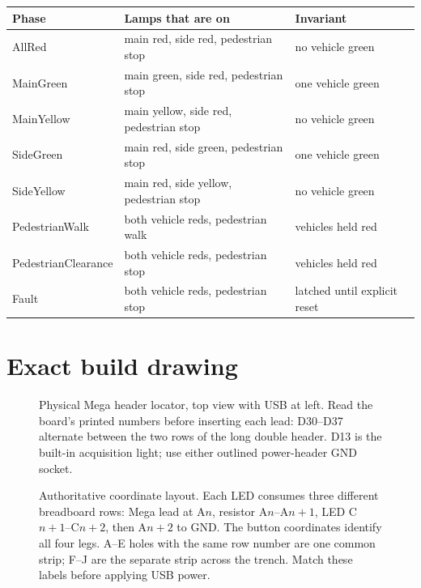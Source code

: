 \documentclass[11pt]{article}
\begin{document}
\begin{tabularx}{\linewidth}{@{}l X X@{}}
\toprule
Phase & Lamps that are on & Invariant\\
\midrule
AllRed & main red, side red, pedestrian stop & no vehicle green\\
MainGreen & main green, side red, pedestrian stop & one vehicle green\\
MainYellow & main yellow, side red, pedestrian stop & no vehicle green\\
SideGreen & main red, side green, pedestrian stop & one vehicle green\\
SideYellow & main red, side yellow, pedestrian stop & no vehicle green\\
PedestrianWalk & both vehicle reds, pedestrian walk & vehicles held red\\
PedestrianClearance & both vehicle reds, pedestrian stop & vehicles held red\\
Fault & both vehicle reds, pedestrian stop & latched until explicit reset\\
\bottomrule
\end{tabularx}

\section{Exact build drawing}

\begin{figure}[ht]
  \centering
  \resizebox{\linewidth}{!}{}
  \caption{Physical Mega header locator, top view with USB at left. Read the
  board's printed numbers before inserting each lead: D30--D37 alternate
  between the two rows of the long double header. D13 is the built-in
  acquisition light; use either outlined power-header GND socket.}
\end{figure}

\begin{figure}[ht]
  \centering
  \resizebox{\linewidth}{!}{}
  \caption{Authoritative coordinate layout. Each LED consumes three different
  breadboard rows: Mega lead at A\(n\), resistor A\(n\)--A\(n+1\), LED
  C\(n+1\)--C\(n+2\), then A\(n+2\) to GND. The button coordinates identify
  all four legs. A--E holes with the same row number are one common strip;
  F--J are the separate strip across the trench. Match these labels before
  applying USB power.}
\end{figure}
\end{document}

